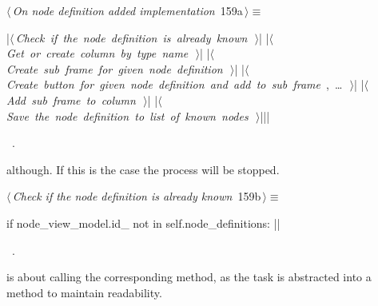 \documentclass[%
    a4paper,    %
    justified,  %
    nobib,      %
    openany     %
]{tufte-book}
\makeatletter
\renewcommand{\label}[1]{\@tufte@label{##1}}%
\makeatother
\begin{document}
\begin{flushleft} \small
\begin{minipage}{\linewidth}\label{scrap154}\raggedright\small
{} $\langle\,${\itshape On node definition added implementation}\nobreak\ {\footnotesize {159a}}$\,\rangle\equiv$
\vspace{-1ex}
\begin{pythoncode}
|\hbox{$\langle\,${\itshape Check if the node definition is already known}\nobreak\ {\footnotesize {}}$\,\rangle$}|
|\hbox{$\langle\,${\itshape Get or create column by type name}\nobreak\ {\footnotesize {}}$\,\rangle$}|
|\hbox{$\langle\,${\itshape Create sub frame for given node definition}\nobreak\ {\footnotesize {}}$\,\rangle$}|
|\hbox{$\langle\,${\itshape Create button for given node definition and add to sub frame}\nobreak\ {\footnotesize {}, \ldots\ }$\,\rangle$}|
|\hbox{$\langle\,${\itshape Add sub frame to column}\nobreak\ {\footnotesize {}}$\,\rangle$}|
|\hbox{$\langle\,${\itshape Save the node definition to list of known nodes}\nobreak\ {\footnotesize {}}$\,\rangle$}||\NWsep|
\end{pythoncode}
\vspace{1.5ex}
\footnotesize
\begin{list}{}{\setlength{\itemsep}{-\parsep}\setlength{\itemindent}{-\leftmargin}}
\item \NWtxtMacroRefIn\ .

\item{}
\end{list}
\end{minipage}\vspace{4ex}
\end{flushleft}
 although. If this is the
case the process will be stopped.

\begin{flushleft} \small
\begin{minipage}{\linewidth}\label{scrap155}\raggedright\small
{} $\langle\,${\itshape Check if the node definition is already known}\nobreak\ {\footnotesize {159b}}$\,\rangle\equiv$
\vspace{-1ex}
\begin{pythoncode}
if node_view_model.id_ not in self.node_definitions:
|\NWsep|
\end{pythoncode}
\vspace{1.5ex}
\footnotesize
\begin{list}{}{\setlength{\itemsep}{-\parsep}\setlength{\itemindent}{-\leftmargin}}
\item \NWtxtMacroRefIn\ .

\item{}
\end{list}
\end{minipage}\vspace{4ex}
\end{flushleft}
 is about calling the corresponding
method, as the task is abstracted into a method to maintain readability.
\end{document}
